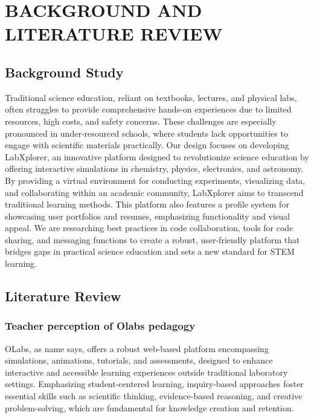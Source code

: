 \chapter{BACKGROUND AND LITERATURE REVIEW}





\section{Background Study}

Traditional science education, reliant on textbooks, lectures, and physical labs, often struggles to provide comprehensive hands-on experiences due to limited resources, high costs, and safety concerns. These challenges are especially pronounced in under-resourced schools, where students lack opportunities to engage with scientific materials practically. Our design focuses on developing LabXplorer, an innovative platform designed to revolutionize science education by offering interactive simulations in chemistry, physics, electronics, and astronomy. By providing a virtual environment for conducting experiments, visualizing data, and collaborating within an academic community, LabXplorer aims to transcend traditional learning methods. This platform also features a profile system for showcasing user portfolios and resumes, emphasizing functionality and visual appeal. We are researching best practices in code collaboration, tools for code sharing, and messaging functions to create a robust, user-friendly platform that bridges gaps in practical science education and sets a new standard for STEM learning.
\section{Literature Review}
\subsection*{Teacher perception of Olabs pedagogy}
OLabs, as name says, offers a robust web-based platform encompassing simulations, animations, tutorials, and assessments, designed to enhance interactive and accessible learning experiences outside traditional laboratory settings. Emphasizing student-centered learning, inquiry-based approaches foster essential skills such as scientific thinking, evidence-based reasoning, and creative problem-solving, which are fundamental for knowledge creation and retention.\cite{chandrashekhar2020teacher}

